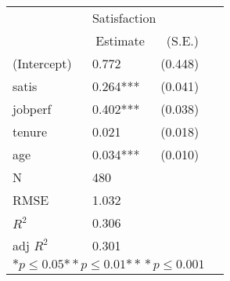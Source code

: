 \begin{tabular}{@{}l*{3}{l}@{}}
\hline
  &\multicolumn{2}{l}{Satisfaction  }\tabularnewline
 &\multicolumn{1}{c}{Estimate}&\multicolumn{1}{c}{(S.E.)}\tabularnewline
 \hline
 \hline
  (Intercept) & 0.772 & (0.448) \tabularnewline
  satis & 0.264*** & (0.041) \tabularnewline
  jobperf & 0.402*** & (0.038) \tabularnewline
  tenure & 0.021 & (0.018) \tabularnewline
  age & 0.034*** & (0.010) \tabularnewline
 \hline
 N&\multicolumn{1}{l}{480}  & \tabularnewline
 RMSE&1.032\tabularnewline
 $R^2$&0.306\tabularnewline
 adj $R^2$&0.301\tabularnewline
 \hline
\hline
 
 \multicolumn{3}{l}{  ${*  p}\le 0.05$${*\!\!*  p}\le 0.01$${*\!\!*\!\!*  p}\le 0.001$}\tabularnewline
 \end{tabular}
